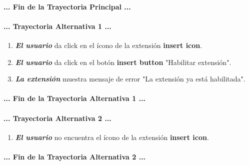 \documentclass[12pt, a4paper, titlepage]{article}
\begin{document}
				\paragraph{... Fin de la Trayectoria Principal ...}
				
		        \paragraph{... Trayectoria Alternativa 1 ...}
				\begin{enumerate}
					\item \textbf{\textit{El usuario}} da click en el ícono de la extensión \textbf{insert icon}.
					\item \textbf{\textit{El usuario}} da click en el botón \textbf{insert button} "Habilitar extensión".
					\item \textbf{\textit{La extensión}} muestra mensaje de error "La extensión ya está habilitada".
				\end{enumerate}
				\paragraph{... Fin de la Trayectoria Alternativa 1 ...}
				
				\paragraph{... Trayectoria Alternativa 2 ...}
				\begin{enumerate}
					\item \textbf{\textit{El usuario}} no encuentra el ícono de la extensión \textbf{insert icon}.
				\end{enumerate}
				\paragraph{... Fin de la Trayectoria Alternativa 2 ...}
				
				\newpage
				
\end{document}
